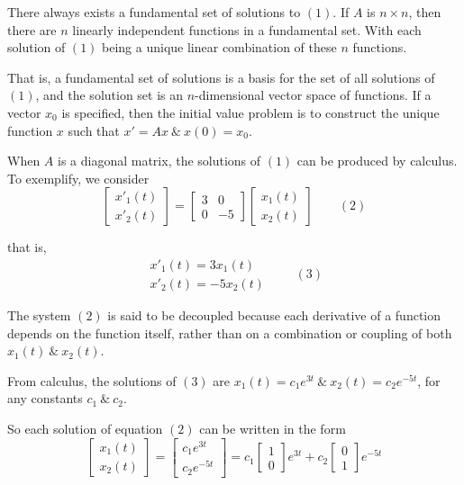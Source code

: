 \documentclass{article}
\begin{document}
  There always exists a fundamental set of solutions to $ (1) $. If $ A $ is $ n \times n $, then there are $ n $ linearly independent functions in a fundamental set. With each solution of $ (1) $ being a unique linear combination of these $ n $ functions. 

  That is, a fundamental set of solutions is a basis for the set of all solutions of $ (1) $, and the solution set is an $ n $-dimensional vector space of functions. If a vector $ x_0 $ is specified, then the initial value problem is to construct the unique function $ x $ such that $ x'=Ax ~\&~ x(0)=x_0 $.

  When $ A $ is a diagonal matrix, the solutions of $ (1) $ can be produced by calculus. To exemplify, we consider
  \[
    \begin{bmatrix}
      x'_1(t)\\
      x'_2(t)
    \end{bmatrix}=
    \begin{bmatrix}
      3 &0\\
      0 &-5
    \end{bmatrix}
    \begin{bmatrix}
      x_1(t)\\
      x_2(t)
    \end{bmatrix} 
    \qquad (2)
  \]

  that is,
  \[
    \begin{gathered}
    x'_1(t) = 3x_1(t)\\
    x'_2(t)=-5x_2(t)
    \end{gathered}
    \qquad (3)
  \]

  The system $ (2) $ is said to  be decoupled because each derivative of a function depends on the function itself, rather than on a combination or coupling of both $ x_1(t) ~\&~ x_2(t) $. 

  From calculus, the solutions of $ (3) $ are $ x_1(t)=c_1e^{3t} ~\&~ x_2(t)=c_2e^{-5t} $, for any constants $ c_1 ~\&~ c_2 $. 

  So each solution of equation $ (2) $ can be written in the form
  \[
    \begin{bmatrix}
      x_1(t)\\
      x_2(t)
    \end{bmatrix}
    =
    \begin{bmatrix}
      c_1e^{3t}\\
      c_2e^{-5t}
    \end{bmatrix}=
    c_1\begin{bmatrix}
      1\\
      0
    \end{bmatrix}e^{3t}
    +
    c_2\begin{bmatrix}
      0\\
      1
    \end{bmatrix}e^{-5t}
  \]
\end{document}
